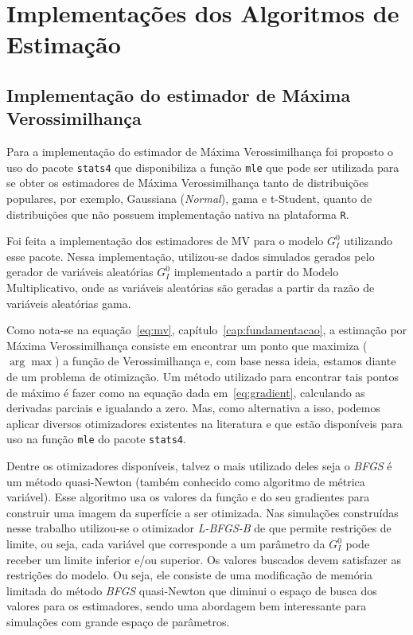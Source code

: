 \section{Implementações dos Algoritmos de Estimação}

\subsection{Implementação do estimador de Máxima Verossimilhança}

Para a implementação do estimador de Máxima Verossimilhança foi proposto o uso do pacote \texttt{stats4} que disponibiliza a função \texttt{mle} que pode ser utilizada para se obter os estimadores de Máxima Verossimilhança tanto de distribuições populares, por exemplo, Gaussiana (\textit{Normal}), gama e t-Student, quanto de distribuições que não possuem implementação nativa na plataforma \texttt{R}.

Foi feita a implementação dos estimadores de MV para o modelo $G_I^0$ utilizando esse pacote. Nessa implementação, utilizou-se dados simulados gerados pelo gerador de variáveis aleatórias $G_I^0$ implementado a partir do Modelo Multiplicativo, onde as variáveis aleatórias são geradas a partir da razão de variáveis aleatórias gama.

Como nota-se na equação~\eqref{eq:mv}, capítulo~\ref{cap:fundamentacao}, a estimação por Máxima Verossimilhança consiste em encontrar um ponto que maximiza ($\arg\max$) a função de Verossimilhança e, com base nessa ideia, estamos diante de um problema de otimização. 
Um método utilizado para encontrar tais pontos de máximo é fazer como na equação dada em~\eqref{eq:gradient}, calculando as derivadas parciais e igualando a zero. 
Mas, como alternativa a isso, podemos aplicar diversos otimizadores existentes na literatura e que estão disponíveis para uso na função \texttt{mle} do pacote \texttt{stats4}.

Dentre os otimizadores disponíveis, talvez o mais utilizado deles seja o \emph{BFGS} é um método quasi-Newton (também conhecido como algoritmo de métrica variável).  
Esse algoritmo usa os valores da função e do seu gradientes para construir uma imagem da superfície a ser otimizada. 
Nas simulações construídas nesse trabalho utilizou-se o otimizador \emph{L-BFGS-B} de \citet{Byrd_1995} que permite restrições de limite, ou seja, cada variável que corresponde a um parâmetro da $G_I^0$ pode receber um limite inferior e/ou superior. 
Os valores buscados devem satisfazer as restrições do modelo. 
Ou seja, ele consiste de uma modificação de memória limitada do método \emph{BFGS} quasi-Newton que diminui o espaço de busca dos valores para os estimadores, sendo uma abordagem bem interessante para simulações com grande espaço de parâmetros.

